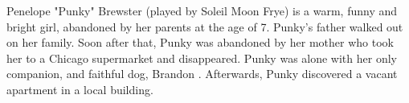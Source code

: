 Penelope "Punky" Brewster (played by Soleil Moon Frye) is a warm, funny and bright girl, abandoned by her parents at the age of 7. Punky's father walked out on her family. Soon after that, Punky was abandoned by her mother who took her to a Chicago supermarket and disappeared. Punky was alone with her only companion, and faithful dog, Brandon \cite{Arimondo:1996a}. Afterwards, Punky discovered a vacant apartment in a local building.
